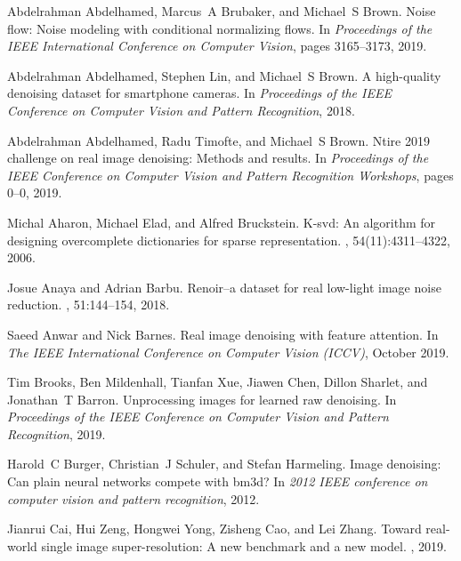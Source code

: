 \documentclass[10pt,twocolumn,letterpaper]{article}
\begin{document}
{\small

\begin{thebibliography}{10}\itemsep=-1pt
	
	Abdelrahman Abdelhamed, Marcus~A Brubaker, and Michael~S Brown.
	\newblock Noise flow: Noise modeling with conditional normalizing flows.
	\newblock In {\em Proceedings of the IEEE International Conference on Computer
		Vision}, pages 3165--3173, 2019.
	
	Abdelrahman Abdelhamed, Stephen Lin, and Michael~S Brown.
	\newblock A high-quality denoising dataset for smartphone cameras.
	\newblock In {\em Proceedings of the IEEE Conference on Computer Vision and
		Pattern Recognition}, 2018.
	
	Abdelrahman Abdelhamed, Radu Timofte, and Michael~S Brown.
	\newblock Ntire 2019 challenge on real image denoising: Methods and results.
	\newblock In {\em Proceedings of the IEEE Conference on Computer Vision and
		Pattern Recognition Workshops}, pages 0--0, 2019.
	
	Michal Aharon, Michael Elad, and Alfred Bruckstein.
	\newblock K-svd: An algorithm for designing overcomplete dictionaries for
	sparse representation.
	, 54(11):4311--4322,
	2006.
	
	Josue Anaya and Adrian Barbu.
	\newblock Renoir--a dataset for real low-light image noise reduction.
	,
	51:144--154, 2018.
	
	Saeed Anwar and Nick Barnes.
	\newblock Real image denoising with feature attention.
	\newblock In {\em The IEEE International Conference on Computer Vision (ICCV)},
	October 2019.
	
	Tim Brooks, Ben Mildenhall, Tianfan Xue, Jiawen Chen, Dillon Sharlet, and
	Jonathan~T Barron.
	\newblock Unprocessing images for learned raw denoising.
	\newblock In {\em Proceedings of the IEEE Conference on Computer Vision and
		Pattern Recognition}, 2019.
	
	Harold~C Burger, Christian~J Schuler, and Stefan Harmeling.
	\newblock Image denoising: Can plain neural networks compete with bm3d?
	\newblock In {\em 2012 IEEE conference on computer vision and pattern
		recognition}, 2012.
	
	Jianrui Cai, Hui Zeng, Hongwei Yong, Zisheng Cao, and Lei Zhang.
	\newblock Toward real-world single image super-resolution: A new benchmark and
	a new model.
	, 2019.
	

\end{thebibliography}}
\end{document}
